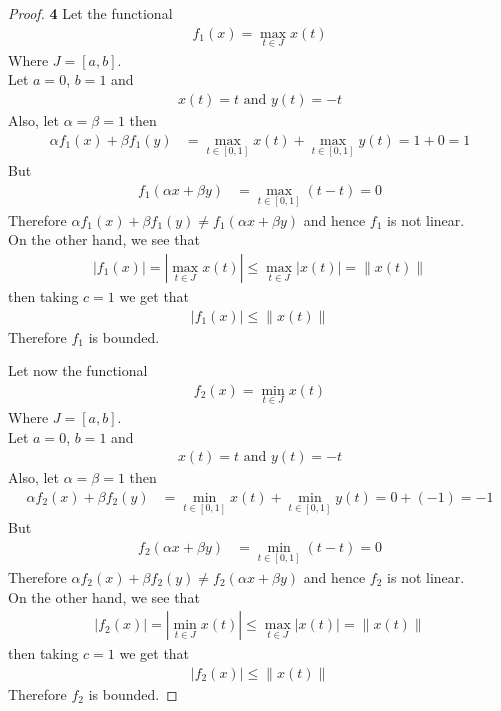 \documentclass[11pt]{article}
\theoremstyle{definition}
\begin{document}
\cleardoublepage
\begin{proof}{\textbf{4}}
    Let the functional
    \begin{align*}
        f_1(x) = \max_{t \in J} x(t)
    \end{align*}
    Where $J = [a, b]$.\\
    Let $a = 0$, $b = 1$ and 
    \begin{align*}
        x(t) = t \text{ and } y(t) = -t
    \end{align*}
    Also, let $\alpha = \beta = 1$ then
    \begin{align*}
        \alpha f_1(x) + \beta f_1(y)
        &= \max_{t \in [0,1]} x(t) + \max_{t \in [0, 1]} y(t)
        = 1 + 0 = 1
    \end{align*}
    But
    \begin{align*}
        f_1(\alpha x + \beta y)
        &= \max_{t \in [0,1]} (t - t) = 0
    \end{align*}
    Therefore $\alpha f_1(x) + \beta f_1(y) \neq f_1(\alpha x + \beta y)$
    and hence $f_1$ is not linear.\\
    On the other hand, we see that
    \begin{align*}
        |f_1(x)| = |\max_{t \in J} x(t)| \leq \max_{t \in J} |x(t)| = \|x(t)\|
    \end{align*}
    then taking $c = 1$ we get that
    \begin{align*}
        |f_1(x)| \leq \|x(t)\|
    \end{align*}
    Therefore $f_1$ is bounded.

    Let now the functional
    \begin{align*}
        f_2(x) = \min_{t \in J} x(t)
    \end{align*}
    Where $J = [a, b]$.\\
    Let $a = 0$, $b = 1$ and 
    \begin{align*}
        x(t) = t \text{ and } y(t) = -t
    \end{align*}
    Also, let $\alpha = \beta = 1$ then
    \begin{align*}
        \alpha f_2(x) + \beta f_2(y)
        &= \min_{t \in [0,1]} x(t) + \min_{t \in [0, 1]} y(t)
        = 0 + (-1) = -1
    \end{align*}
    But
    \begin{align*}
        f_2(\alpha x + \beta y)
        &= \min_{t \in [0,1]} (t - t) = 0
    \end{align*}
    Therefore $\alpha f_2(x) + \beta f_2(y) \neq f_2(\alpha x + \beta y)$
    and hence $f_2$ is not linear.\\
    On the other hand, we see that
    \begin{align*}
        |f_2(x)| = |\min_{t \in J} x(t)| \leq \max_{t \in J} |x(t)| = \|x(t)\|
    \end{align*}
    then taking $c = 1$ we get that
    \begin{align*}
        |f_2(x)| \leq \|x(t)\|
    \end{align*}
    Therefore $f_2$ is bounded.
\end{proof}
\end{document}
